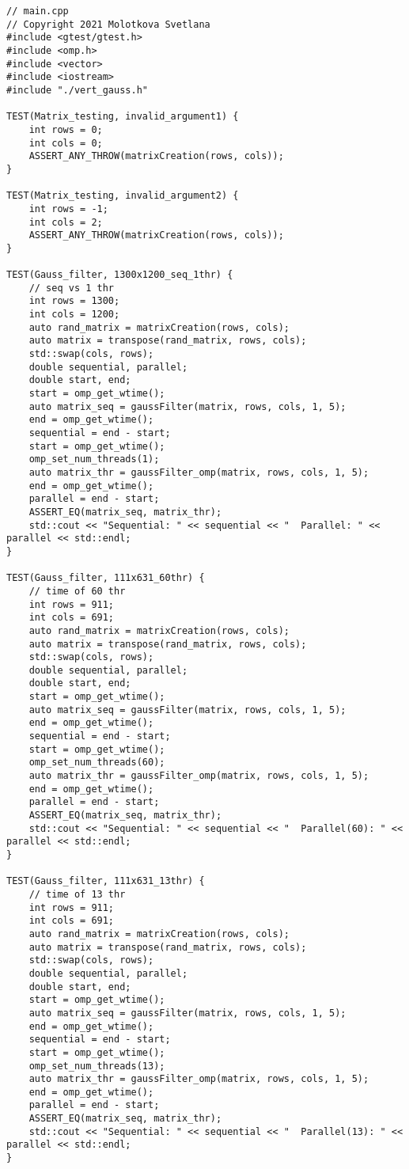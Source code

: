 \documentclass{report}
\begin{document}
\begin{lstlisting}
// main.cpp
// Copyright 2021 Molotkova Svetlana
#include <gtest/gtest.h>
#include <omp.h>
#include <vector>
#include <iostream>
#include "./vert_gauss.h"

TEST(Matrix_testing, invalid_argument1) {
	int rows = 0;
	int cols = 0;
	ASSERT_ANY_THROW(matrixCreation(rows, cols));
}

TEST(Matrix_testing, invalid_argument2) {
	int rows = -1;
	int cols = 2;
	ASSERT_ANY_THROW(matrixCreation(rows, cols));
}

TEST(Gauss_filter, 1300x1200_seq_1thr) {
	// seq vs 1 thr
	int rows = 1300;
	int cols = 1200;
	auto rand_matrix = matrixCreation(rows, cols);
	auto matrix = transpose(rand_matrix, rows, cols);
	std::swap(cols, rows);
	double sequential, parallel;
	double start, end;
	start = omp_get_wtime();
	auto matrix_seq = gaussFilter(matrix, rows, cols, 1, 5);
	end = omp_get_wtime();
	sequential = end - start;
	start = omp_get_wtime();
	omp_set_num_threads(1);
	auto matrix_thr = gaussFilter_omp(matrix, rows, cols, 1, 5);
	end = omp_get_wtime();
	parallel = end - start;
	ASSERT_EQ(matrix_seq, matrix_thr);
	std::cout << "Sequential: " << sequential << "  Parallel: " << parallel << std::endl;
}

TEST(Gauss_filter, 111x631_60thr) {
	// time of 60 thr
	int rows = 911;
	int cols = 691;
	auto rand_matrix = matrixCreation(rows, cols);
	auto matrix = transpose(rand_matrix, rows, cols);
	std::swap(cols, rows);
	double sequential, parallel;
	double start, end;
	start = omp_get_wtime();
	auto matrix_seq = gaussFilter(matrix, rows, cols, 1, 5);
	end = omp_get_wtime();
	sequential = end - start;
	start = omp_get_wtime();
	omp_set_num_threads(60);
	auto matrix_thr = gaussFilter_omp(matrix, rows, cols, 1, 5);
	end = omp_get_wtime();
	parallel = end - start;
	ASSERT_EQ(matrix_seq, matrix_thr);
	std::cout << "Sequential: " << sequential << "  Parallel(60): " << parallel << std::endl;
}

TEST(Gauss_filter, 111x631_13thr) {
	// time of 13 thr
	int rows = 911;
	int cols = 691;
	auto rand_matrix = matrixCreation(rows, cols);
	auto matrix = transpose(rand_matrix, rows, cols);
	std::swap(cols, rows);
	double sequential, parallel;
	double start, end;
	start = omp_get_wtime();
	auto matrix_seq = gaussFilter(matrix, rows, cols, 1, 5);
	end = omp_get_wtime();
	sequential = end - start;
	start = omp_get_wtime();
	omp_set_num_threads(13);
	auto matrix_thr = gaussFilter_omp(matrix, rows, cols, 1, 5);
	end = omp_get_wtime();
	parallel = end - start;
	ASSERT_EQ(matrix_seq, matrix_thr);
	std::cout << "Sequential: " << sequential << "  Parallel(13): " << parallel << std::endl;
}


\end{lstlisting}
\end{document}
